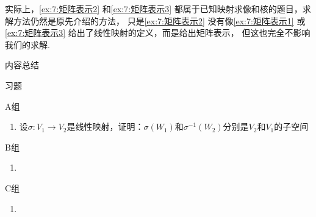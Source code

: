 实际上，\autoref{ex:7:矩阵表示2} 和\autoref{ex:7:矩阵表示3} 都属于已知映射求像和核的题目，求解方法仍然是原先介绍的方法，
只是\autoref*{ex:7:矩阵表示2} 没有像\autoref{ex:7:矩阵表示1} 或\autoref*{ex:7:矩阵表示3} 给出了线性映射的定义，而是给出矩阵表示，
但这也完全不影响我们的求解.

\vspace{2ex}
\centerline{\heiti \Large 内容总结}

\vspace{2ex}

\centerline{\heiti \Large 习题}
\vspace{2ex}
{\kaishu }
\begin{flushright}
    \kaishu

\end{flushright}
\centerline{\heiti A组}
\begin{enumerate}
    \item 设$\sigma: V_1\to V_2$是线性映射，证明：$\sigma(W_1)$和$\sigma^{-1}(W_2)$分别是$V_2$和$V_1$的子空间
\end{enumerate}
\centerline{\heiti B组}
\begin{enumerate}
    \item
\end{enumerate}
\centerline{\heiti C组}
\begin{enumerate}
    \item
\end{enumerate}
